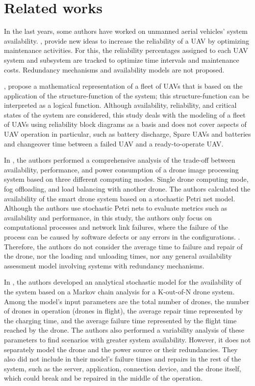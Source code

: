 \documentclass[conference]{IEEEtran}
\begin{document}
\section{Related works}\label{sec:related_works}

In the last years, some authors have worked on unmanned aerial vehicles' system availability. \citet{Petritoli2017, Petritoli2018}, provide new ideas to increase the reliability of a UAV by optimizing maintenance activities. For this, the reliability percentages assigned to each UAV system and subsystem are tracked to optimize time intervals and maintenance costs. Redundancy mechanisms and availability models are not proposed.

\citet{Zaitseva2020, rusnak2019reliability}, propose a mathematical representation of a fleet of UAVs that is based on the application of the structure-function of the system; this structure-function can be interpreted as a logical function. Although availability, reliability, and critical states of the system are considered, this study deals with the modeling of a fleet of UAVs using reliability block diagrams as a basis and does not cover aspects of UAV operation in particular, such as battery discharge, Spare UAVs and batteries and changeover time between a failed UAV and a ready-to-operate UAV.

In \citet{Machida2021, Report}, the authors performed a comprehensive analysis of the trade-off between availability, performance, and power consumption of a drone image processing system based on three different computing modes. Single drone computing mode, fog offloading, and load balancing with another drone. The authors calculated the availability of the smart drone system based on a stochastic Petri net model. Although the authors use stochastic Petri nets to evaluate metrics such as availability and performance, in this study, the authors only focus on computational processes and network link failures, where the failure of the process can be caused by software defects or any errors in the configurations. . Therefore, the authors do not consider the average time to failure and repair of the drone, nor the loading and unloading times, nor any general availability assessment model involving systems with redundancy mechanisms.

In \citet{Maccarthy2019}, the authors developed an analytical stochastic model for the availability of the system based on a Markov chain analysis for a K-out-of-N drone system. Among the model's input parameters are the total number of drones, the number of drones in operation (drones in flight), the average repair time represented by the charging time, and the average failure time represented by the flight time reached by the drone. The authors also performed a variability analysis of these parameters to find scenarios with greater system availability. However, it does not separately model the drone and the power source or their redundancies. They also did not include in their model's failure times and repairs in the rest of the system, such as the server, application, connection device, and the drone itself, which could break and be repaired in the middle of the operation.
\end{document}
